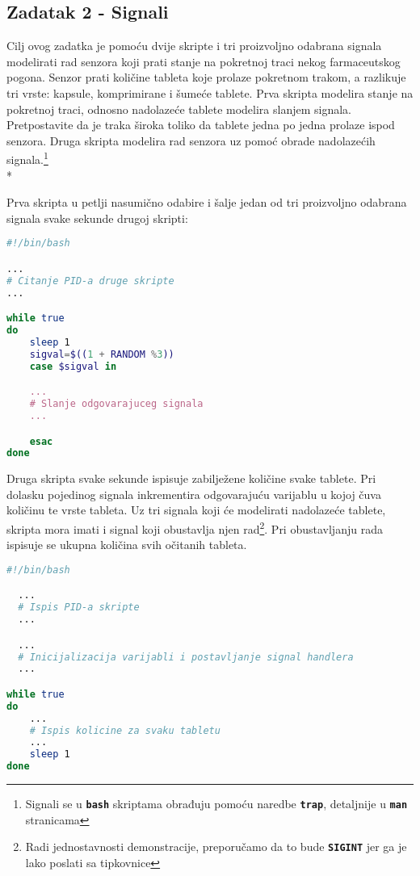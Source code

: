 \documentclass[12pt,a4paper]{article}
\newcommand{\shell}[1]{\texttt{\textbf{#1}}}
\begin{document}
\subsection*{Zadatak 2 - Signali}
Cilj ovog zadatka je pomoću dvije skripte i tri proizvoljno odabrana signala modelirati rad senzora koji prati stanje na pokretnoj traci nekog farmaceutskog pogona. Senzor prati količine tableta koje prolaze pokretnom trakom, a razlikuje tri vrste: kapsule, komprimirane i šumeće tablete. Prva skripta modelira stanje na pokretnoj traci, odnosno nadolazeće tablete modelira slanjem signala. Pretpostavite da je traka široka toliko da tablete jedna po jedna prolaze ispod senzora. Druga skripta modelira rad senzora uz pomoć obrade nadolazećih signala.\footnote{Signali se u \shell{bash} skriptama obrađuju pomoću naredbe \shell{trap}, detaljnije u \shell{man} stranicama}\\*

\noindent Prva skripta u petlji nasumično odabire i šalje jedan od tri proizvoljno odabrana signala svake sekunde drugoj skripti:\\


\begin{lstlisting}[language=bash,caption={Kostur prve skripte}]
#!/bin/bash

...
# Citanje PID-a druge skripte
...

while true
do
    sleep 1
    sigval=$((1 + RANDOM %3))
    case $sigval in

    ...
    # Slanje odgovarajuceg signala 
    ...

    esac
done
\end{lstlisting}

\noindent Druga skripta svake sekunde ispisuje zabilježene količine svake tablete. Pri dolasku pojedinog signala inkrementira odgovarajuću varijablu u kojoj čuva količinu te vrste tableta. Uz tri signala koji će modelirati nadolazeće tablete, skripta mora imati i signal koji obustavlja njen rad\footnote{Radi jednostavnosti demonstracije, preporučamo da to bude \shell{SIGINT} jer ga je lako poslati sa tipkovnice}. Pri obustavljanju rada ispisuje se ukupna količina svih očitanih tableta.\\


\begin{lstlisting}[language=bash,caption={Kostur druge skripte}]
#!/bin/bash

  ...
  # Ispis PID-a skripte
  ...

  ...
  # Inicijalizacija varijabli i postavljanje signal handlera
  ...

while true
do
    ...
    # Ispis kolicine za svaku tabletu
    ...
    sleep 1
done
\end{lstlisting}
\end{document}
